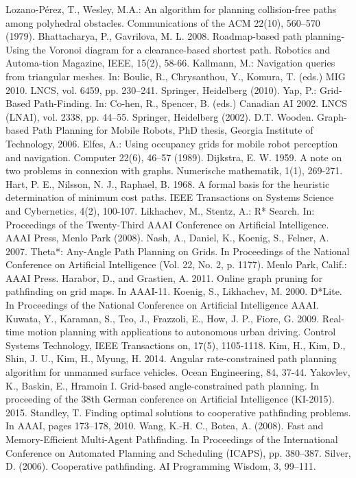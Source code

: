 \documentclass[runningheads,a4paper]{llncs}
\begin{document}
\begin{thebibliography}{4}
 Lozano-Pérez, T., Wesley, M.A.: An algorithm for planning collision-free paths among polyhedral obstacles. Communications of the ACM 22(10), 560--570 (1979).
 Bhattacharya, P., Gavrilova, M. L. 2008. Roadmap-based path planning-Using the Voronoi diagram for a clearance-based shortest path. Robotics and Automa-tion Magazine, IEEE, 15(2), 58-66. 
 Kallmann, M.: Navigation queries from triangular meshes. In: Boulic, R., Chrysanthou, Y., Komura, T. (eds.) MIG 2010. LNCS, vol. 6459, pp. 230--241. Springer, Heidelberg (2010).
 Yap, P.: Grid-Based Path-Finding. In: Co-hen, R., Spencer, B. (eds.) Canadian AI 2002. LNCS (LNAI), vol. 2338, pp. 44--55. Springer, Heidelberg (2002).
 D.T. Wooden. Graph-based Path Planning for Mobile Robots, PhD thesis, Georgia Institute of Technology, 2006.
 Elfes, A.: Using occupancy grids for mobile robot perception and navigation. Computer 22(6), 46--57 (1989).
 Dijkstra, E. W. 1959. A note on two problems in connexion with graphs. Numerische mathematik, 1(1), 269-271.
 Hart, P. E., Nilsson, N. J., Raphael, B. 1968. A formal basis for the heuristic determination of minimum cost paths. IEEE Transactions on Systems Science and Cybernetics, 4(2), 100-107.
 Likhachev, M., Stentz, A.: R* Search. In: Proceedings of the Twenty-Third AAAI Conference on Artificial Intelligence. AAAI Press, Menlo Park (2008).
 Nash, A., Daniel, K., Koenig, S., Felner, A. 2007. Theta*: Any-Angle Path Planning on Grids. In Proceedings of the National Conference on Artificial Intelligence (Vol. 22, No. 2, p. 1177). Menlo Park, Calif.: AAAI Press.
 Harabor, D., and Grastien, A. 2011. Online graph pruning for pathfinding on grid maps. In AAAI-11.
 Koenig, S., Likhachev, M. 2000. D*Lite. In Proceedings of the National Conference on Artificial Intelligence AAAI.
 Kuwata, Y., Karaman, S., Teo, J., Frazzoli, E., How, J. P., Fiore, G. 2009. Real-time motion planning with applications to autonomous urban driving. Control Systems Technology, IEEE Transactions on, 17(5), 1105-1118.
 Kim, H., Kim, D., Shin, J. U., Kim, H., Myung, H. 2014. Angular rate-constrained path planning algorithm for unmanned surface vehicles. Ocean Engineering, 84, 37-44.
 Yakovlev, K., Baskin, E., Hramoin I. Grid-based angle-constrained path planning. In proceeding of the 38th German conference on Artificial Intelligence (KI-2015). 2015.
 Standley, T. Finding optimal solutions to cooperative pathfinding problems. In AAAI, pages 173--178, 2010.
 Wang, K.-H. C., Botea, A. (2008). Fast and Memory-Efficient Multi-Agent Pathfinding. In Proceedings of the International Conference on Automated Planning and Scheduling (ICAPS), pp. 380--387.
 Silver, D. (2006). Cooperative pathfinding. AI Programming Wisdom, 3, 99--111.


\end{thebibliography}
\end{document}
